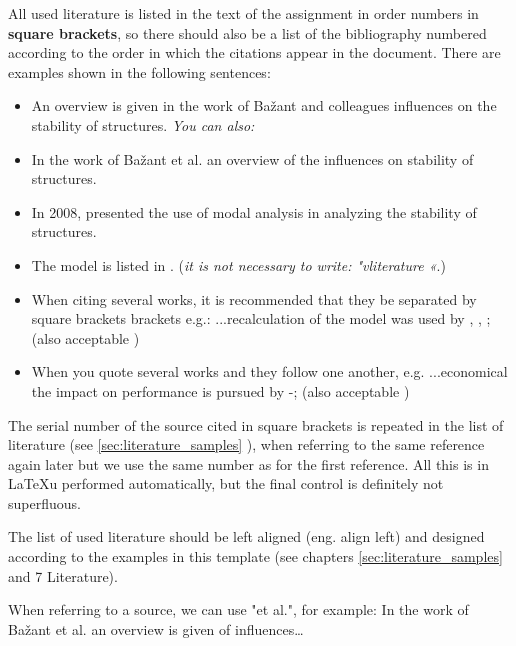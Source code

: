 All used literature is listed in the text of the assignment in order
numbers in \textbf{square brackets}, so there should also be a list of the bibliography
numbered according to the order in which the citations appear in the document. There are examples
shown in the following sentences:
\begin{itemize}
\item An overview is given in the work of Bažant and colleagues \cite{bazant_1991}
influences on the stability of structures. \emph{You can also:}
\item In the work of Bažant et al. \cite{bazant_1991} an overview of the influences on
stability of structures.
\item In 2008, \citet{Bazant_2008} presented
the use of modal analysis in analyzing the stability of structures.
\item The model is listed in \cite{Doe_1991}. (\emph{it is not necessary to write: "vliterature \cite{Doe_1991}«}.)
\item When citing several works, it is recommended that they be separated by square brackets
brackets e.g.: ...recalculation of the model was used by \cite{bazant_1991},
\cite{Doe_1991}, \cite{Bazant_2008}; (also acceptable
\cite{bazant_1991,Doe_1991,Bazant_2008})
\item When you quote several works and they follow one another, e.g. ...economical
the impact on performance is pursued by \cite{bazant_1991}-\cite{Bazant_2008};
(also acceptable \cite{bazant_1991, stropnik_1997,
Doe_1991,Loukides_2020, Bazant_2008})
\end{itemize}

The serial number of the source cited in square brackets is
repeated in the list of literature (see \ref{sec:literature_samples}
), when referring to the same reference again later
but we use the same number as for the first reference. All this is in \LaTeX u
performed automatically, but the final control is definitely not superfluous.

The list of used literature should be left aligned (eng. align left) and
designed according to the examples in this template (see chapters \ref{sec:literature_samples}
 and 7 Literature).

When referring to a source, we can use "et
al.", for example: In the work of Bažant et al. \cite{bazant_1991} an overview is given
of influences\ldots

